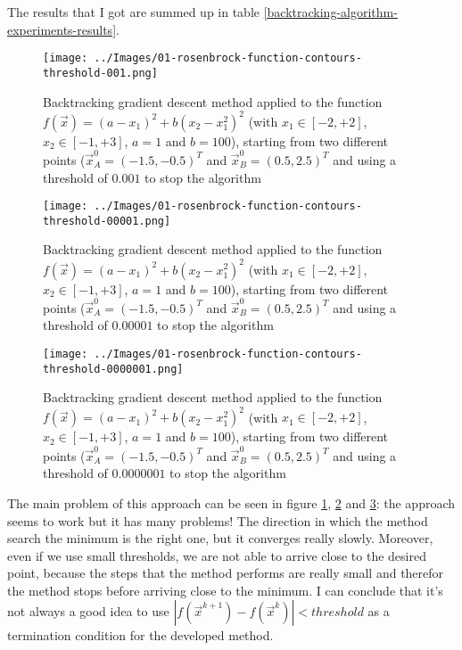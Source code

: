         The results that I got are summed up in table \ref{backtracking-algorithm-experiments-results}.
        \begin{figure}
            \centering
            \texttt{[image: ../Images/01-rosenbrock-function-contours-threshold-001.png]}
            \caption{Backtracking gradient descent method applied to the function \(f(\vec{x}) = (a - x_1)^2 + b(x_2 - x_1^2)^2\) (with \(x_1 \in [-2, +2]\), \(x_2 \in [-1, +3]\), \(a=1\) and \(b=100\)), starting from two different points (\(\vec{x}_A^0 = (-1.5,-0.5)^T\) and \(\vec{x}_B^0 = (0.5, 2.5)^T\) and using a threshold of \(0.001\) to stop the algorithm}
            \label{rosenbrock-function-contours-threshold-001}
        \end{figure}
        \begin{figure}
            \centering
            \texttt{[image: ../Images/01-rosenbrock-function-contours-threshold-00001.png]}
            \caption{Backtracking gradient descent method applied to the function \(f(\vec{x}) = (a - x_1)^2 + b(x_2 - x_1^2)^2\) (with \(x_1 \in [-2, +2]\), \(x_2 \in [-1, +3]\), \(a=1\) and \(b=100\)), starting from two different points (\(\vec{x}_A^0 = (-1.5,-0.5)^T\) and \(\vec{x}_B^0 = (0.5, 2.5)^T\) and using a threshold of \(0.00001\) to stop the algorithm}
            \label{rosenbrock-function-contours-threshold-00001}
        \end{figure}
        \begin{figure}
            \centering
            \texttt{[image: ../Images/01-rosenbrock-function-contours-threshold-0000001.png]}
            \caption{Backtracking gradient descent method applied to the function \(f(\vec{x}) = (a - x_1)^2 + b(x_2 - x_1^2)^2\) (with \(x_1 \in [-2, +2]\), \(x_2 \in [-1, +3]\), \(a=1\) and \(b=100\)), starting from two different points (\(\vec{x}_A^0 = (-1.5,-0.5)^T\) and \(\vec{x}_B^0 = (0.5, 2.5)^T\) and using a threshold of \(0.0000001\) to stop the algorithm}
            \label{rosenbrock-function-contours-threshold-0000001}
        \end{figure}
        The main problem of this approach can be seen in figure \ref{rosenbrock-function-contours-threshold-001}, \ref{rosenbrock-function-contours-threshold-00001} and \ref{rosenbrock-function-contours-threshold-0000001}: the approach seems to work but it has many problems! The direction in which the method search the minimum is the right one, but it converges really slowly. Moreover, even if we use small thresholds, we are not able to arrive close to the desired point, because the steps that the method performs are really small and therefor the method stops before arriving close to the minimum. I can conclude that it's not always a good idea to use \(|f(\vec{x}^{k+1}) - f(\vec{x}^k)| < threshold\) as a termination condition for the developed method.
